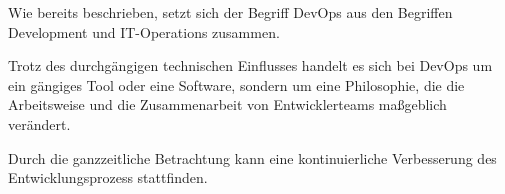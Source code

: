 \label{ref_devops}
Wie bereits beschrieben, setzt sich der Begriff DevOps aus den Begriffen Development und IT-Operations zusammen. 

Trotz des durchgängigen technischen Einflusses handelt es sich bei DevOps  um ein gängiges Tool oder eine Software, sondern um eine Philosophie, die die Arbeitsweise und die Zusammenarbeit von Entwicklerteams maßgeblich verändert. 

Durch die ganzzeitliche Betrachtung kann eine kontinuierliche Verbesserung des Entwicklungsprozess stattfinden.